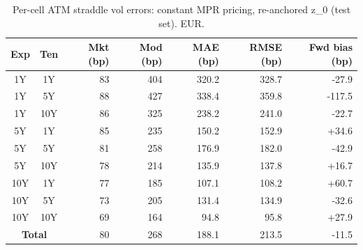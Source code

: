 \begin{table}[H]
\centering
\caption{Per-cell ATM straddle vol errors: constant MPR pricing, re-anchored z_0 (test set). EUR.}
\label{tab:constant_mpr_anchored_per_cell_test}
\small
\begin{tabular}{@{}ccrrrrr@{}}
\toprule
\textbf{Exp} & \textbf{Ten} & \textbf{Mkt (bp)} & \textbf{Mod (bp)} & \textbf{MAE (bp)} & \textbf{RMSE (bp)} & \textbf{Fwd bias (bp)} \\
\midrule
  1Y & 1Y & 83 & 404 & 320.2 & 328.7 & -27.9 \\
  1Y & 5Y & 88 & 427 & 338.4 & 359.8 & -117.5 \\
  1Y & 10Y & 86 & 325 & 238.2 & 241.0 & -22.7 \\
  \midrule
  5Y & 1Y & 85 & 235 & 150.2 & 152.9 & +34.6 \\
  5Y & 5Y & 81 & 258 & 176.9 & 182.0 & -42.9 \\
  5Y & 10Y & 78 & 214 & 135.9 & 137.8 & +16.7 \\
  \midrule
  10Y & 1Y & 77 & 185 & 107.1 & 108.2 & +60.7 \\
  10Y & 5Y & 73 & 205 & 131.4 & 134.9 & -32.6 \\
  10Y & 10Y & 69 & 164 & 94.8 & 95.8 & +27.9 \\
  \midrule
  \multicolumn{2}{c}{\textbf{Total}} & 80 & 268 & 188.1 & 213.5 & -11.5 \\
\bottomrule
\end{tabular}
\end{table}